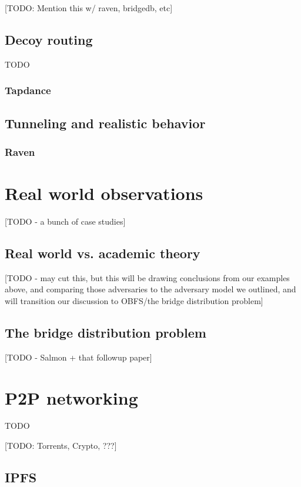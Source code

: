\documentclass[12pt]{report}
\begin{document}
[TODO: Mention this w/ raven, bridgedb, etc]

\subsection{Decoy routing}

TODO

\subsubsection{Tapdance}

\subsection{Tunneling and realistic behavior}

\subsubsection{Raven}

\section{Real world observations}

[TODO - a bunch of case studies]

\subsection{Real world vs. academic theory}

[TODO - may cut this, but this will be drawing conclusions from our examples above, and comparing those adversaries to the adversary model we outlined, and will transition our discussion to OBFS/the bridge distribution problem]

\subsection{The bridge distribution problem}

[TODO - Salmon + that followup paper]

\section{P2P networking}

TODO

[TODO: Torrents, Crypto, ???]

\subsection{IPFS}
\end{document}
